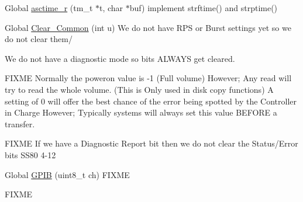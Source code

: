 
\begin{DoxyRefList}
\item[Global \mbox{\hyperlink{time_8h_a7ffc52def0c7fbf70c50248e3f7d6a8a}{asctime\+\_\+r}} (tm\+\_\+t $\ast$t, char $\ast$buf)]\label{todo__todo000001}%
%
implement strftime() and strptime()  
\item[Global \mbox{\hyperlink{ss80_8h_aa48ccb1479e226dacfaa1dac15631a9d}{Clear\+\_\+\+Common}} (int u)]\label{todo__todo000042}%
%
We do not have R\+PS or Burst settings yet so we do not clear them/ 

We do not have a diagnostic mode so bits A\+L\+W\+A\+YS get cleared. 

\label{todo__todo000043}%
%
F\+I\+X\+ME Normally the poweron value is -\/1 (Full volume) However; Any read will try to read the whole volume. (This is Only used in disk copy functions) A setting of 0 will offer the best chance of the error being spotted by the Controller in Charge However; Typically systems will always set this value B\+E\+F\+O\+RE a transfer. 

\label{todo__todo000044}%
%
F\+I\+X\+ME If we have a Diagnostic Report bit then we do not clear the Status/\+Error bits S\+S80 4-\/12  
\item[Global \mbox{\hyperlink{gpib__task_8h_ac63d4e431ab55dddfbf436d87135128e}{G\+P\+IB}} (uint8\+\_\+t ch)]\label{todo__todo000004}%
%
F\+I\+X\+ME 

\label{todo__todo000005}%
%
F\+I\+X\+ME 


\end{DoxyRefList}
